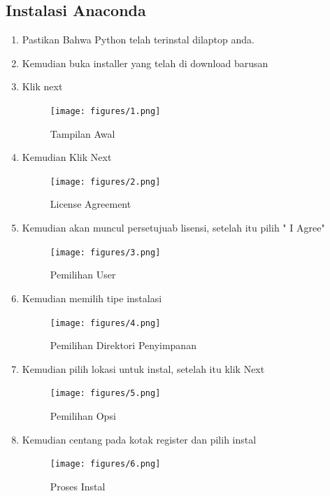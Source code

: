 \subsection{Instalasi Anaconda}
\begin{enumerate}
    \item Pastikan Bahwa Python telah terinstal dilaptop anda.
    \item Kemudian buka installer yang telah di download barusan
    \item Klik next
    \begin{figure}[!htbp]
        \centering
        \texttt{[image: figures/1.png]}
        \caption{Tampilan Awal}
        \label{awal}
        \end{figure}

    \item Kemudian Klik Next
    \begin{figure}[!htbp]
        \centering
        \texttt{[image: figures/2.png]}
        \caption{License Agreement}
        \label{License}
        \end{figure}

    \item Kemudian akan muncul persetujuab lisensi, setelah itu pilih " I Agree"
    \begin{figure}[!htbp]
        \centering
        \texttt{[image: figures/3.png]}
        \caption{Pemilihan User}
        \label{User}
        \end{figure}

    \item Kemudian memilih tipe instalasi
    \begin{figure}[!htbp]
        \centering
        \texttt{[image: figures/4.png]}
        \caption{Pemilihan Direktori Penyimpanan}
        \label{Directory}
        \end{figure}

    \item Kemudian pilih lokasi untuk instal, setelah itu klik Next
    \begin{figure}[!htbp]
        \centering
        \texttt{[image: figures/5.png]}
        \caption{Pemilihan Opsi}
        \label{opsi}
        \end{figure}

    \item Kemudian centang pada kotak register dan pilih instal
    \begin{figure}[!htbp]
        \centering
        \texttt{[image: figures/6.png]}
        \caption{Proses Instal}
        \label{Proses}
        \end{figure}


\end{enumerate}
